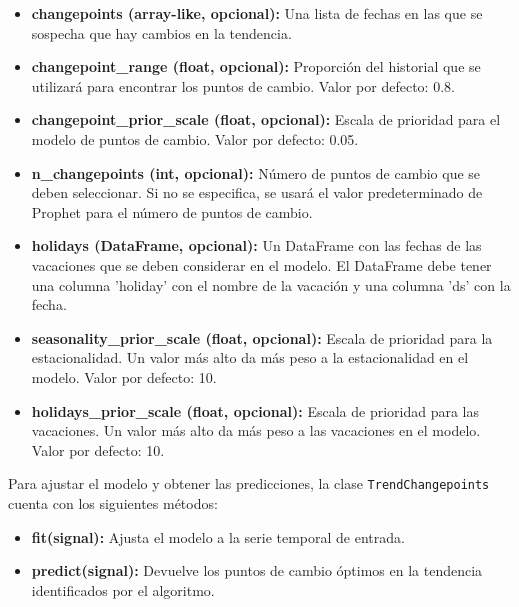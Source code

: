 \documentclass{article}[14pts]
\begin{document}
      \begin{itemize}

        \item \textbf{changepoints (array-like, opcional):} Una lista de fechas en las que se sospecha que hay cambios en la tendencia.
        \item \textbf{changepoint\_range (float, opcional):} Proporción del historial que se utilizará para encontrar los puntos de cambio. Valor por defecto: 0.8.
        \item \textbf{changepoint\_prior\_scale (float, opcional):} Escala de prioridad para el modelo de puntos de cambio. Valor por defecto: 0.05.
        \item \textbf{n\_changepoints (int, opcional):} Número de puntos de cambio que se deben seleccionar. Si no se especifica, se usará el valor predeterminado de Prophet para el número de puntos de cambio.
        \item \textbf{holidays (DataFrame, opcional):} Un DataFrame con las fechas de las vacaciones que se deben considerar en el modelo. El DataFrame debe tener una columna 'holiday' con el nombre de la vacación y una columna 'ds' con la fecha.
        \item \textbf{seasonality\_prior\_scale (float, opcional):} Escala de prioridad para la estacionalidad. Un valor más alto da más peso a la estacionalidad en el modelo. Valor por defecto: 10.
        \item \textbf{holidays\_prior\_scale (float, opcional):} Escala de prioridad para las vacaciones. Un valor más alto da más peso a las vacaciones en el modelo. Valor por defecto: 10.
      \end{itemize}

      Para ajustar el modelo y obtener las predicciones, la clase \texttt{TrendChangepoints} cuenta con los siguientes métodos:

      \begin{itemize}
        \item \textbf{fit(signal):} Ajusta el modelo a la serie temporal de entrada.
        
        \item \textbf{predict(signal):} Devuelve los puntos de cambio óptimos en la tendencia identificados por el algoritmo.
      \end{itemize}
\end{document}
